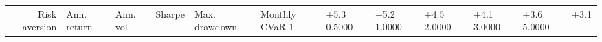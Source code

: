 \begin{tabular}{rlllllll}
\toprule
Risk aversion & Ann. return & Ann. vol. & Sharpe & Max. drawdown & Monthly CVaR 1%
 & +5.3%
0.5000 & +5.2%
1.0000 & +4.5%
2.0000 & +4.1%
3.0000 & +3.6%
5.0000 & +3.1%
\bottomrule
\end{tabular}
